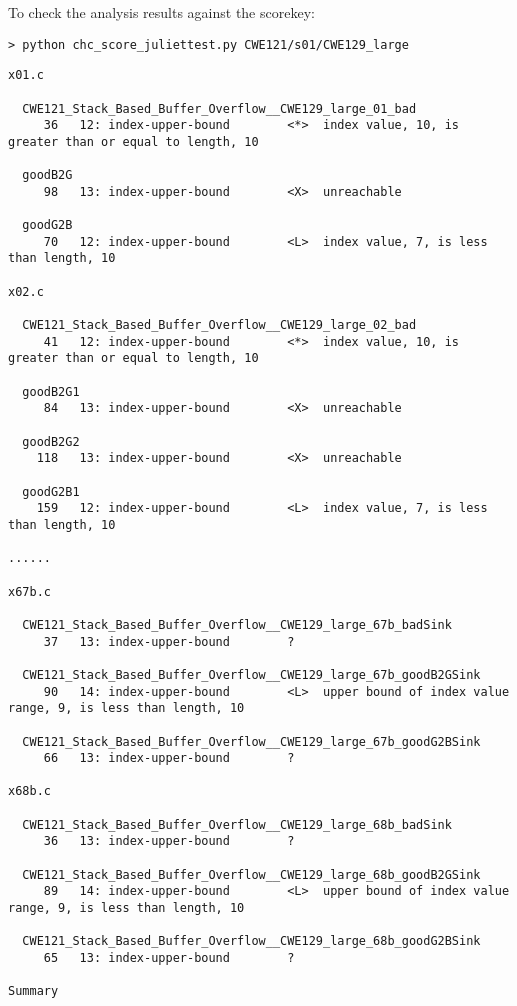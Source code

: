 \documentclass[11pt]{article}
\begin{document}
To check the analysis results against the scorekey:
\begin{verbatim}
> python chc_score_juliettest.py CWE121/s01/CWE129_large
\end{verbatim}
\begin{scriptsize}
\begin{verbatim}
x01.c

  CWE121_Stack_Based_Buffer_Overflow__CWE129_large_01_bad
     36   12: index-upper-bound        <*>  index value, 10, is greater than or equal to length, 10

  goodB2G
     98   13: index-upper-bound        <X>  unreachable

  goodG2B
     70   12: index-upper-bound        <L>  index value, 7, is less than length, 10

x02.c

  CWE121_Stack_Based_Buffer_Overflow__CWE129_large_02_bad
     41   12: index-upper-bound        <*>  index value, 10, is greater than or equal to length, 10

  goodB2G1
     84   13: index-upper-bound        <X>  unreachable

  goodB2G2
    118   13: index-upper-bound        <X>  unreachable

  goodG2B1
    159   12: index-upper-bound        <L>  index value, 7, is less than length, 10

......

x67b.c

  CWE121_Stack_Based_Buffer_Overflow__CWE129_large_67b_badSink
     37   13: index-upper-bound        ?

  CWE121_Stack_Based_Buffer_Overflow__CWE129_large_67b_goodB2GSink
     90   14: index-upper-bound        <L>  upper bound of index value range, 9, is less than length, 10

  CWE121_Stack_Based_Buffer_Overflow__CWE129_large_67b_goodG2BSink
     66   13: index-upper-bound        ?

x68b.c

  CWE121_Stack_Based_Buffer_Overflow__CWE129_large_68b_badSink
     36   13: index-upper-bound        ?

  CWE121_Stack_Based_Buffer_Overflow__CWE129_large_68b_goodB2GSink
     89   14: index-upper-bound        <L>  upper bound of index value range, 9, is less than length, 10

  CWE121_Stack_Based_Buffer_Overflow__CWE129_large_68b_goodG2BSink
     65   13: index-upper-bound        ?

Summary


\end{verbatim}
\end{scriptsize}
\end{document}
